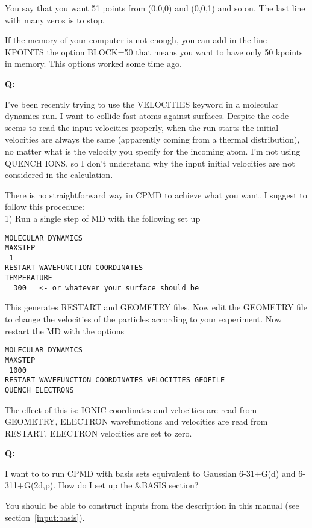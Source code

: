 \documentclass[twoside,10pt,titlepage,a4paper]{article}
\newcommand{\reflabel}[1]{\hypertarget{#1}}
\newcommand{\reflabel}[1]{\label{#1}}
\newcommand{\faqquestion}[1]{\vspace{2ex}\reflabel{faq#1}{{\bf Q:\ }}}
\newcommand{\faqanswer}{\vspace{1ex}{{\bf A:\ }}}
\begin{document}
You say that you want 51 points from (0,0,0) and (0,0,1) and
so on. The last line with many zeros is to stop.

If the memory of your computer is not enough, you can add in
the line KPOINTS the option BLOCK=50 that means you want to
have only 50 kpoints in memory. This options worked some time ago.

\faqquestion{velocities}
   I've been recently trying to use the VELOCITIES keyword in a molecular
dynamics run. I want to collide fast atoms against surfaces. Despite the
code seems to read the input velocities properly, when the run starts the
initial velocities are always the same (apparently coming from a
thermal distribution), no matter what is the velocity you specify for the
                incoming atom. I'm not using QUENCH IONS, so I don't understand why the
input initial velocities are not considered in the calculation.

\faqanswer
There is no straightforward way in CPMD to achieve what you
want. I suggest to follow this procedure:\\

1) Run a single step of MD with the following set up
\begin{verbatim}
MOLECULAR DYNAMICS
MAXSTEP
 1
RESTART WAVEFUNCTION COORDINATES
TEMPERATURE
  300   <- or whatever your surface should be
\end{verbatim}

This generates RESTART and GEOMETRY files.
Now edit the GEOMETRY file to change the velocities
of the particles according to your experiment.
Now restart the MD with the options
\begin{verbatim}
MOLECULAR DYNAMICS
MAXSTEP
 1000
RESTART WAVEFUNCTION COORDINATES VELOCITIES GEOFILE
QUENCH ELECTRONS
\end{verbatim}
The effect of this is:
IONIC coordinates and velocities are read from GEOMETRY,
ELECTRON wavefunctions and velocities are read from RESTART,
ELECTRON velocities are set to zero.

\faqquestion{gaussianbasis}
I want to to run CPMD with basis sets equivalent to Gaussian
6-31+G(d) and 6-311+G(2d,p). How do I set up the \&BASIS section?

\faqanswer
You should be able to construct
inputs from the description in this manual (see section~\ref{input:basis}).
\end{document}
